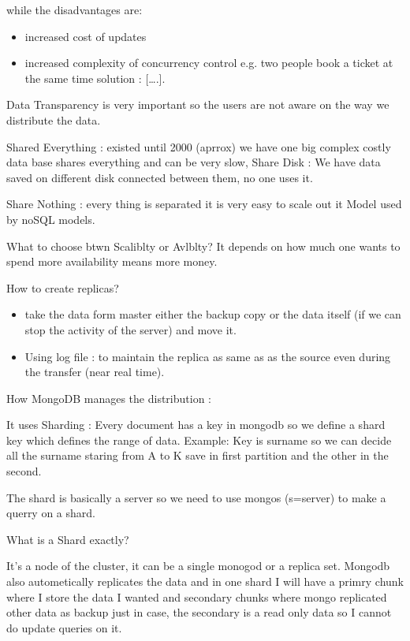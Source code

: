 \documentclass[a4page, 11pt]{article}
\begin{document}
while the disadvantages are:

\begin{itemize}[noitemsep]
	 
	\item
	increased cost of updates
	\item
	increased complexity of concurrency control e.g. two people book a ticket at the same time solution : {[}\ldots{}.{]}.
\end{itemize}

Data Transparency is very important so the users are not aware on the way we distribute the data.

Shared Everything : existed until 2000 (aprrox) we have one big complex costly data base shares everything and can be very slow, Share Disk : We have data saved on different disk connected between them,
no one uses it.

Share Nothing : every thing is separated it is very easy to scale out it Model used by noSQL models.

What to choose btwn Scaliblty or Avlblty? It depends on how much one wants to spend more availability means more money.

How to create replicas?
\begin{itemize}[noitemsep]
	\item take the data form master either the backup copy or the data itself	(if we can stop the activity of the server) and move it.
	\item Using log file : to maintain the replica as same as as the source even during the transfer (near real time).
\end{itemize}




How MongoDB manages the distribution :

It uses Sharding : Every document has a key in mongodb so we define a shard key which defines the range of data. 
Example: Key is surname so we can decide all the surname staring from A to K save in first partition and
the other in the second.

The shard is basically a server so we need to use mongos (s=server) to make a querry on a shard.

What is a Shard exactly?

It's a node of the cluster, it can be a single monogod or a replica set. 
Mongodb also autometically replicates the data and in one shard I will have a primry chunk where I store the data I wanted and secondary chunks where mongo replicated other data as backup just in case, the secondary is a read only data so I cannot do update queries on it.
\end{document}
